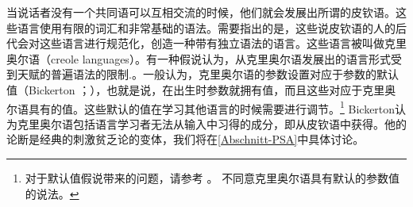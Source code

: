 当说话者没有一个共同语可以互相交流的时候，他们就会发展出所谓的皮钦语。这些语言使用有限的词汇和非常基础的语法。需要指出的是，这些说皮钦语的人的后代会对这些语言进行规范化，创造一种带有独立语法的语言。这些语言被叫做克里奥尔语（creole languages）。有一种假说认为，从克里奥尔语发展出的语言形式受到天赋的普遍语法的限制\citep{Bickerton84a}.。一般认为，克里奥尔语的参数设置对应于参数的默认值（Bickerton \citeyear[]{Bickerton84b}；\citeyear[]{Bickerton84a}），也就是说，在出生时参数就拥有值，而且这些对应于克里奥尔语具有的值。这些默认的值在学习其他语言的时候需要进行调节。\footnote{%
对于默认值假说带来的问题，请参考 。 \citet[, fn.\,13]{Bickerton97a}不同意克里奥尔语具有默认的参数值的说法。
} 
Bickerton认为克里奥尔语包括语言学习者无法从输入中习得的成分，即从皮钦语中获得。他的论断是经典的刺激贫乏论的变体，我们将在\ref{Abschnitt-PSA}中具体讨论。

